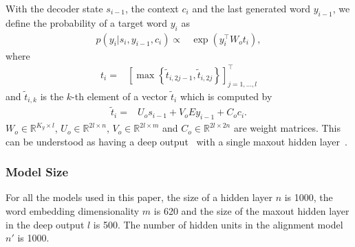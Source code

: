 \documentclass{article}
\begin{document}
With the decoder state $s_{i-1}$, the context $c_{i}$ and the last generated word
$y_{i-1}$, we define the probability of a target word $y_{i}$ as
\begin{align*}
    p(y_{i}|s_i,y_{i-1},c_{i}) \propto& \exp\left(y_{i}^{\top} W_o t_{i}\right),
\end{align*}
where
\begin{align*}
    t_i =&  \left[ \max\left\{\tilde{t}_{i, 2j-1}, \tilde{t}_{i,2j}\right\}
    \right]_{j=1,\ldots,l}^{\top}
\end{align*}
and $\tilde{t}_{i,k}$ is the $k$-th element of a vector $\tilde{t}_i$ which is
computed by
\begin{align*}
    \tilde{t}_{i} =& U_o s_{i - 1} + V_o E y_{i-1} + C_o c_i.
\end{align*}
$W_o \in \mathbb{R}^{K_y\times  l}$, $U_o \in \mathbb{R}^{2l\times n}$, $V_o \in
\mathbb{R}^{2l\times m}$ and $C_o \in \mathbb{R}^{2l\times 2n}$ are weight
matrices. This can be understood as having a deep output~\citep{Pascanu2014rec}
with a single maxout hidden layer~\citep{Goodfellow2013}.

\subsubsection{Model Size}

For all the models used in this paper, the size of a hidden layer $n$ is 1000,
the word embedding dimensionality $m$ is 620 and the size of the maxout hidden
layer in the deep output $l$ is 500. The number of hidden units in the alignment
model $n'$ is 1000.
\end{document}
